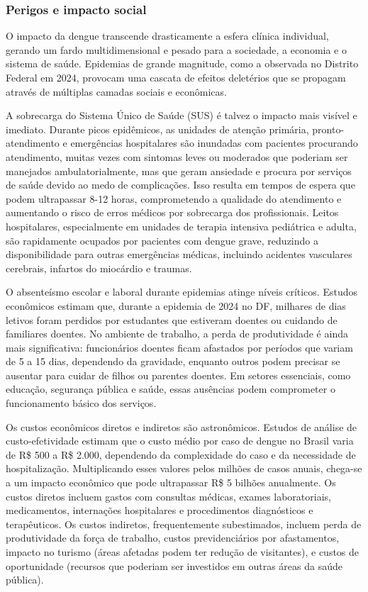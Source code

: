 \subsubsection{Perigos e impacto social}

O impacto da dengue transcende drasticamente a esfera clínica individual, gerando um fardo multidimensional e pesado para a sociedade, a economia e o sistema de saúde. Epidemias de grande magnitude, como a observada no Distrito Federal em 2024, provocam uma cascata de efeitos deletérios que se propagam através de múltiplas camadas sociais e econômicas.

A sobrecarga do Sistema Único de Saúde (SUS) é talvez o impacto mais visível e imediato. Durante picos epidêmicos, as unidades de atenção primária, pronto-atendimento e emergências hospitalares são inundadas com pacientes procurando atendimento, muitas vezes com sintomas leves ou moderados que poderiam ser manejados ambulatorialmente, mas que geram ansiedade e procura por serviços de saúde devido ao medo de complicações. Isso resulta em tempos de espera que podem ultrapassar 8-12 horas, comprometendo a qualidade do atendimento e aumentando o risco de erros médicos por sobrecarga dos profissionais. Leitos hospitalares, especialmente em unidades de terapia intensiva pediátrica e adulta, são rapidamente ocupados por pacientes com dengue grave, reduzindo a disponibilidade para outras emergências médicas, incluindo acidentes vasculares cerebrais, infartos do miocárdio e traumas.

O absenteísmo escolar e laboral durante epidemias atinge níveis críticos. Estudos econômicos estimam que, durante a epidemia de 2024 no DF, milhares de dias letivos foram perdidos por estudantes que estiveram doentes ou cuidando de familiares doentes. No ambiente de trabalho, a perda de produtividade é ainda mais significativa: funcionários doentes ficam afastados por períodos que variam de 5 a 15 dias, dependendo da gravidade, enquanto outros podem precisar se ausentar para cuidar de filhos ou parentes doentes. Em setores essenciais, como educação, segurança pública e saúde, essas ausências podem comprometer o funcionamento básico dos serviços.

Os custos econômicos diretos e indiretos são astronômicos. Estudos de análise de custo-efetividade estimam que o custo médio por caso de dengue no Brasil varia de R\$ 500 a R\$ 2.000, dependendo da complexidade do caso e da necessidade de hospitalização. Multiplicando esses valores pelos milhões de casos anuais, chega-se a um impacto econômico que pode ultrapassar R\$ 5 bilhões anualmente. Os custos diretos incluem gastos com consultas médicas, exames laboratoriais, medicamentos, internações hospitalares e procedimentos diagnósticos e terapêuticos. Os custos indiretos, frequentemente subestimados, incluem perda de produtividade da força de trabalho, custos previdenciários por afastamentos, impacto no turismo (áreas afetadas podem ter redução de visitantes), e custos de oportunidade (recursos que poderiam ser investidos em outras áreas da saúde pública).

